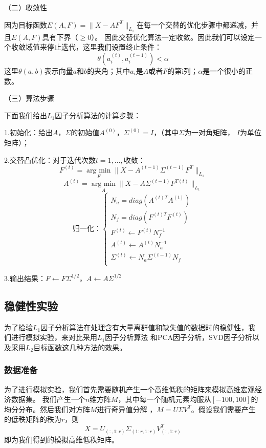 （二）收敛性

因为目标函数$E(A, F) = \|X - AF^T\|_{L_1}$在每一个交替的优化步骤中都递减，并且$E(A,F)$具有下界（$\geq 0$）。
因此交替优化算法一定收敛。因此我们可以设定一个收敛域值来停止迭代，这里我们设置终止条件：
    $$ \theta(a_i^{(t)}, a_i^{(t-1)}) <  \alpha $$
这里$\theta(a, b)$表示向量$a$和$b$的夹角；其中$a_i$是$A$或者$F$的第i列；$\alpha$是一个很小的正数。

（三）算法步骤

下面我们给出$L_1$因子分析算法的计算步骤：

1.初始化：给出$A$，$\Sigma$的初始值$A^{(0)}$，$\Sigma^{(0)} = I$，（其中$\Sigma$为一对角矩阵，
$I$为单位矩阵）；

2.交替凸优化：对于迭代次数$t = 1, ..., $收敛：
$$F^{(t)} = \underset{F}{\operatorname{arg\ min}} \|X - A^{(t-1)}\Sigma^{(t-1)}F^{T}\|_{L_1}$$
$$A^{(t)} = \underset{A}{\operatorname{arg\ min}} \|X - A\Sigma^{(t-1)}F^{T(t)} \|_{L_1}$$
\begin{equation*}
    \text{归一化：}\left\{
                 \begin{array}{clr}
                 N_a = diag(A^{(t)T}A^{(t)})\\
                 N_f = diag(F^{(t)T}F^{(t)})\\
                 F^{(t)} \leftarrow F^{(t)}N_f^{-1}\\
                 A^{(t)}\leftarrow A^{(t)}N_a^{-1}\\
                 \Sigma^{(t)} \leftarrow N_a\Sigma^{(t-1)}N_f\\
                 \end{array}
    \right.
\end{equation*}

3.输出结果：$F \leftarrow F\Sigma^{1/2}$，$A \leftarrow A\Sigma^{1/2}$

\subsection{稳健性实验}
为了检验$L_1$因子分析算法在处理含有大量离群值和缺失值的数据时的稳健性，我们进行模拟实验，来对比采用$L_1$因子分析算法
和PCA因子分析，SVD因子分析以及采用$L_2$目标函数这几种方法的效果。

\subsubsection{数据准备}
为了进行模拟实验，我们首先需要随机产生一个高维低秩的矩阵来模拟高维宏观经济数据集。
我们产生一个$n$维方阵$M$，其中每一个随机元素均服从$[-100, 100]$的均分分布。然后我们对方阵$M$进行奇异值分解
，$M = U\Sigma V^{T}$。假设我们需要产生的低秩矩阵的秩为$r$，则$$X = U_{(:,1:r)}\Sigma_{(1:r,1:r)}V^T_{(:,1:r)}$$
即为我们得到的模拟高维低秩矩阵。


